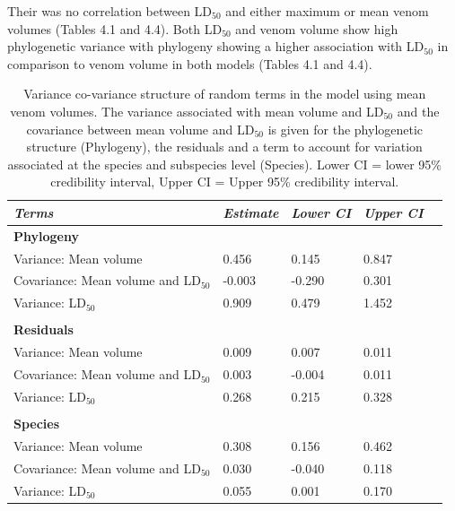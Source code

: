 Their was no correlation between LD$_{50}$ and either maximum or mean venom volumes (Tables 4.1 and 4.4). Both LD$_{50}$  and venom volume show high phylogenetic variance with phylogeny showing a higher association with LD$_{50}$ in comparison to venom volume in both models (Tables 4.1 and 4.4). 

\clearpage

\begin{table}[H]
  \centering
    \caption[ ]{Variance co-variance structure of random terms in the model using mean venom volumes. The variance associated with mean volume and LD$_{50}$ and the covariance between mean volume and LD$_{50}$ is given for the phylogenetic structure (Phylogeny), the residuals and a term to account for variation associated at the species and subspecies level (Species). Lower CI = lower 95\% credibility interval, Upper CI = Upper 95\% credibility interval.}
\begin{tabular}{*5l}    \toprule
\emph{Terms} & \emph{Estimate} & \emph{Lower CI} & \emph{Upper CI}\\\midrule
\textbf{Phylogeny} &   &   &  \\ 
Variance: Mean volume & 0.456 & 0.145 & 0.847 \\
Covariance: Mean volume and LD$_{50}$ &-0.003  &-0.290  & 0.301 \\
Variance: LD$_{50}$ & 0.909 & 0.479 & 1.452 \\

 &   &   &  \\

\textbf{Residuals} &   &   &  \\ 
Variance: Mean volume & 0.009 & 0.007 & 0.011 \\
Covariance: Mean volume and LD$_{50}$ & 0.003  &  -0.004  & 0.011 \\
Variance: LD$_{50}$ & 0.268 & 0.215 & 0.328 \\

 &   &   &  \\ 

\textbf{Species} &   &   &  \\ 
Variance: Mean volume & 0.308 & 0.156 & 0.462 \\
Covariance: Mean volume and LD$_{50}$ & 0.030  &  -0.040  & 0.118 \\
Variance: LD$_{50}$ & 0.055 & 0.001 & 0.170 \\\bottomrule
 \hline
\end{tabular}
  \label{tbl:Table 4.1.}
\end{table}




